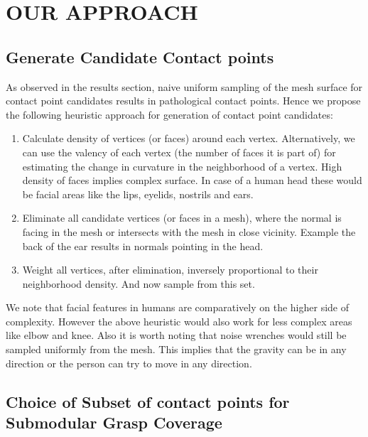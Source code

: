 
\section{OUR APPROACH}
\label{sec:Algorithm}


\subsection{Generate Candidate Contact points}
\label{subSec:genContacts}
As observed in the results section, naive uniform sampling of the mesh surface 
for contact point candidates results in pathological contact points. Hence we 
propose the following heuristic approach for generation of contact point 
candidates:
\begin{enumerate}
\item Calculate density of vertices (or faces) around each vertex. 
Alternatively, we can use the valency of each vertex (the number of faces it is 
part of) for estimating the change in curvature in the neighborhood of a 
vertex. 
High density of faces implies complex surface. In case of a human head these 
 would be facial areas like the lips, eyelids, nostrils and ears.

\item Eliminate all candidate vertices (or faces in a mesh), where the normal 
is facing in the mesh or intersects with the mesh in close vicinity. Example 
the back of the ear results in normals pointing in the head. 

\item Weight all vertices, after elimination, inversely proportional to their 
neighborhood density. And now sample from this set. 

\end{enumerate}

We note that facial features in humans are comparatively on the higher side of 
complexity. However the above heuristic would also work for less complex areas 
like elbow and knee. 
Also it is worth noting that noise wrenches would still be sampled uniformly from the mesh. This implies that the gravity can be in any direction or the person can try to move in any direction.




\subsection{Choice of Subset of contact points for Submodular Grasp Coverage}

